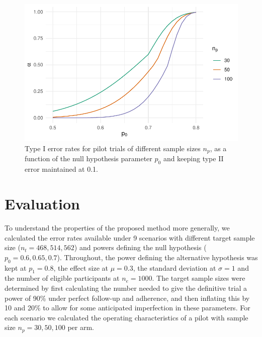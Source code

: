 \documentclass[AMA,STIX1COL]{WileyNJD-v2}
\begin{document}
\begin{figure}
\centering
\includegraphics[scale=0.8]{./Figures/alt.pdf}
\caption{Type I error rates for pilot trials of different sample sizes $n_p$, as a function of the null hypothesis parameter $p_0$ and keeping type II error maintained at 0.1.}
\label{fig:alt}
\end{figure}

\section{Evaluation}\label{sec:eval}

To understand the properties of the proposed method more generally, we calculated the error rates available under 9 scenarios with different target sample size ($n_t = 468, 514, 562$) and powers defining the null hypothesis ($p_0 = 0.6, 0.65, 0.7$). Throughout, the power defining the alternative hypothesis was kept at $p_1 = 0.8$, the effect size at $\mu = 0.3$, the standard deviation at $\sigma = 1$ and the number of eligible participants at $n_e = 1000$. The target sample sizes were determined by first calculating the number needed to give the definitive trial a power of 90\% under perfect follow-up and adherence, and then inflating this by 10 and 20\% to allow for some anticipated imperfection in these parameters. For each scenario we calculated the operating characteristics of a pilot with sample size $n_p = 30, 50, 100$ per arm.

 
\end{document}
